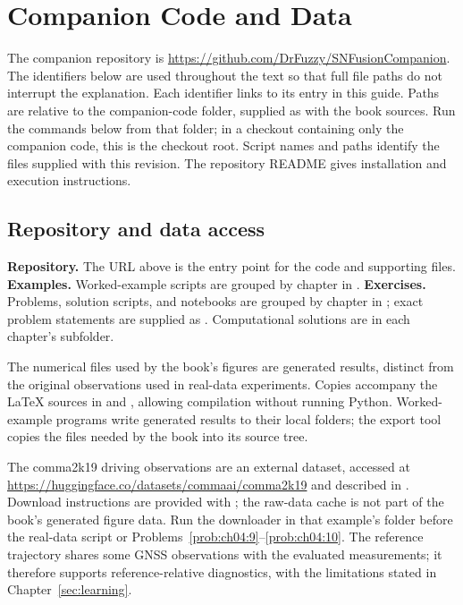\chapter*{Companion Code and Data}
\label{sec:companion-code}
The companion repository is \url{https://github.com/DrFuzzy/SNFusionCompanion}.
The identifiers below are used throughout the text so that full file paths do not interrupt the explanation. Each identifier links to its entry in this guide. Paths are relative to the companion-code folder, supplied as  with the book sources. Run the commands below from that folder; in a checkout containing only the companion code, this is the checkout root. Script names and paths identify the files supplied with this revision. The repository README gives installation and execution instructions.

\section*{Repository and data access}
\label{code:Repository}
\textbf{Repository.} The URL above is the entry point for the code and supporting files.
\label{code:Examples}
\textbf{Examples.} Worked-example scripts are grouped by chapter in .
\label{code:Exercises}
\textbf{Exercises.} Problems, solution scripts, and notebooks are grouped by chapter in ; exact problem statements are supplied as . Computational solutions are in each chapter's  subfolder.

The numerical files used by the book's figures are generated results, distinct from the original observations used in real-data experiments. Copies accompany the LaTeX sources in  and , allowing compilation without running Python. Worked-example programs write generated results to their local  folders; the export tool copies the files needed by the book into its source tree.

The comma2k19 driving observations are an external dataset, accessed at \url{https://huggingface.co/datasets/commaai/comma2k19} and described in \cite{schafer2018_comma2k19}. Download instructions are provided with ; the raw-data cache is not part of the book's generated figure data. Run the downloader in that example's folder before the real-data script or Problems~\ref{prob:ch04:9}--\ref{prob:ch04:10}. The reference trajectory shares some GNSS observations with the evaluated measurements; it therefore supports reference-relative diagnostics, with the limitations stated in Chapter~\ref{sec:learning}.

